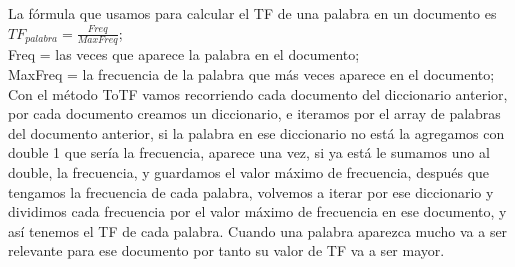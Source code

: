 \documentclass[12pt, a4paper]{article}
\begin{document}
\begin{enumerate}
                  La fórmula que usamos para calcular el TF de una palabra
                  en un documento es
            $TF_{palabra}=\frac{Freq}{MaxFreq}$;\\
            Freq = las veces que aparece la palabra en el documento;\\
            MaxFreq = la frecuencia de la palabra que más veces aparece en el documento;\\
            Con el método ToTF vamos recorriendo cada documento del diccionario anterior,
            por cada documento creamos un diccionario, e iteramos por el array de
            palabras del documento anterior, si la palabra en ese diccionario no
            está la agregamos con double 1 que sería la frecuencia, aparece una vez,
            si ya está le sumamos uno al double, la frecuencia,
            y guardamos el valor máximo de frecuencia, después que tengamos
            la frecuencia de cada palabra, volvemos a iterar por ese diccionario y
            dividimos cada frecuencia por el valor máximo de frecuencia en ese documento,
            y así tenemos el TF de cada palabra. Cuando una palabra aparezca mucho va a ser
            relevante para ese documento por tanto su valor de TF va a ser mayor.


\end{enumerate}
\end{document}
